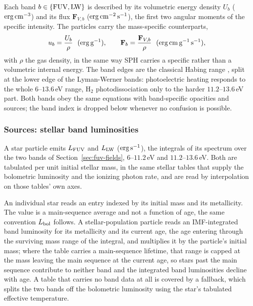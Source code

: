 Each band $b\in\{{\rm FUV},{\rm LW}\}$ is described by its volumetric
energy density $U_b$ (${\rm erg\,cm^{-3}}$) and its flux $\mathbf
F_{V,b}$ (${\rm erg\,cm^{-2}\,s^{-1}}$), the first two angular moments of
the specific intensity. The particles carry the mass-specific
counterparts,
\begin{equation}
  u_b = \frac{U_b}{\rho}\ \ ({\rm erg\,g^{-1}}), \qquad
  \mathbf F_b = \frac{\mathbf F_{V,b}}{\rho}\ \ ({\rm erg\,cm\,g^{-1}\,s^{-1}}),
  \label{eq:fuv-specific-fields}
\end{equation}
with $\rho$ the gas density, in the same way SPH carries a specific
rather than a volumetric internal energy. The band edges are the
classical Habing range \citep{Habing1968}, split at the lower edge of the
Lyman-Werner bands: photoelectric heating responds to the whole $6$--$13.6$\,eV range,
H$_2$ photodissociation only to the harder $11.2$--$13.6$\,eV part. Both
bands obey the same equations with band-specific opacities and sources;
the band index is dropped below whenever no confusion is possible.

\subsubsection{Sources: stellar band luminosities}
\label{sec:fuv-sources}

A star particle emits $L_{\rm FUV}$ and $L_{\rm LW}$ (${\rm erg\,s^{-1}}$),
the integrals of its spectrum over the two bands of
Section~\ref{sec:fuv-fields}, $6$--$11.2$\,eV and $11.2$--$13.6$\,eV. Both
are tabulated per unit initial stellar mass, in the same stellar tables that
supply the bolometric luminosity and the ionizing photon rate, and are read
by interpolation on those tables' own axes.

An individual star reads an entry indexed by its initial mass and its
metallicity. The value is a main-sequence average and not a function of
age, the same convention $L_{\rm bol}$ follows. A stellar-population
particle reads an IMF-integrated band luminosity for its metallicity and
its current age, the age entering through the surviving mass range of the
integral, and multiplies it by the particle's initial mass; where the table
carries a main-sequence lifetime, that range is capped at the mass leaving
the main sequence at the current age, so stars past the main sequence
contribute to neither band and the integrated band luminosities decline
with age. A table that carries no band data at all is covered by a
fallback, which splits the two bands off the bolometric luminosity using
the star's tabulated effective temperature.

